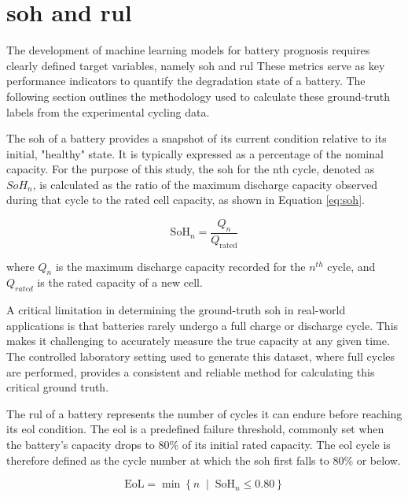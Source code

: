 \section{\acl{soh} and \acl{rul}} \label{sec:soh_rul}

The development of machine learning models for battery prognosis requires clearly defined target variables, namely \acf{soh} and \acf{rul} These metrics serve as key performance indicators to quantify the degradation state of a battery. The following section outlines the methodology used to calculate these ground-truth labels from the experimental cycling data.

The \acf{soh} of a battery provides a snapshot of its current condition relative to its initial, "healthy" state. It is typically expressed as a percentage of the nominal capacity. For the purpose of this study, the \ac{soh} for the nth cycle, denoted as $SoH_n$, is calculated as the ratio of the maximum discharge capacity observed during that cycle to the rated cell capacity, as shown in Equation \ref{eq:soh}.

\begin{equation}
    \mathrm{SoH}_n = \frac{Q_n}{Q_{\text{rated}}}
    \label{eq:soh}
\end{equation}

where $Q_n$ is the maximum discharge capacity recorded for the $n^{th}$ cycle, and $Q_{rated}$ is the rated capacity of a new cell.

A critical limitation in determining the ground-truth \ac{soh} in real-world applications is that batteries rarely undergo a full charge or discharge cycle. This makes it challenging to accurately measure the true capacity at any given time. The controlled laboratory setting used to generate this dataset, where full cycles are performed, provides a consistent and reliable method for calculating this critical ground truth.

The \ac{rul} of a battery represents the number of cycles it can endure before reaching its \ac{eol} condition. The \ac{eol} is a predefined failure threshold, commonly set when the battery's capacity drops to 80\% of its initial rated capacity. The \ac{eol} cycle is therefore defined as the cycle number at which the \ac{soh} first falls to 80\% or below.

\begin{equation}
    \mathrm{EoL} = \min \left\{ n \;\middle|\; \mathrm{SoH}_n \leq 0.80 \right\}
    \label{eq:eol}
\end{equation}

